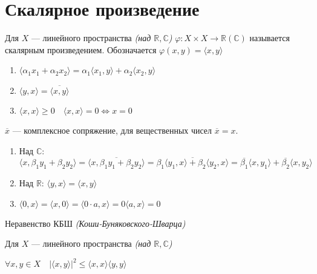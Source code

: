 




\section{Скалярное произведение}

\begin{definition}
    Для $X$ --- линейного пространства \textit{(над $\mathbb{R}, \mathbb{C}$)} $\varphi:X\times X \to \mathbb{R} (\mathbb{C})$ называется скалярным произведением. Обозначается $\varphi(x,y)=\langle x,y\rangle$
\end{definition}

\begin{enumerate}
    \item $\langle \alpha_1 x_1+\alpha_2 x_2 \rangle = \alpha_1\langle x_1,y\rangle+\alpha_2\langle x_2,y\rangle$\
    \item $\langle y,x\rangle = \overline{\langle x,y\rangle}$
    \item $\langle x,x\rangle \geq 0 \quad \langle x,x\rangle=0 \Leftrightarrow x=0$
\end{enumerate}

\begin{definition}
    $\overline{x}$ --- комплексное сопряжение, для вещественных чисел $\overline{x} = x$.    
\end{definition}

\begin{enumerate}
    \item Над $\mathbb{C}$: $\langle x,\beta_1 y_1 + \beta_2 y_2 \rangle = \overline{\langle x,\beta_1 y_1 + \beta_2 y_2 \rangle} = \overline{\beta_1\langle y_1, x\rangle + \beta_2 \langle y_2,x \rangle} = \overline{\beta_1} \langle x, y_1\rangle + \overline{\beta_2} \langle x,y_2\rangle$
    \item Над $\mathbb{R}$: $\langle y,x\rangle = \langle x,y\rangle$
    \item $\langle 0,x \rangle = \langle x,0 \rangle = \langle 0\cdot a,x \rangle = 0\langle a,x \rangle=0$
\end{enumerate}

\begin{lemma}
    Неравенство КБШ \textit{(Коши-Буняковского-Шварца)}
    
    Для $X$ --- линейного пространства \textit{(над $\mathbb{R}, \mathbb{C}$)}

    $\forall x,y\in X\quad |\langle x,y\rangle|^2\leq \langle x,x\rangle \langle y,y\rangle$
\end{lemma}


